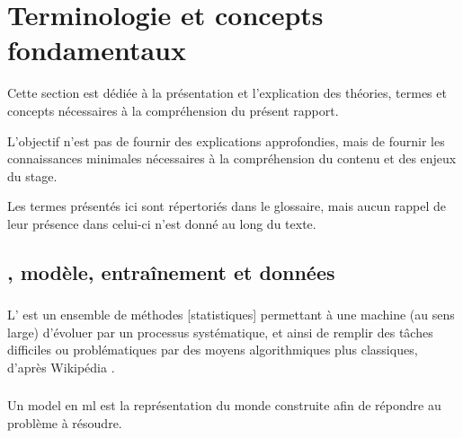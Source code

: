 \chapter{Terminologie et concepts fondamentaux}
Cette section est dédiée à la présentation et l'explication des théories, termes et concepts nécessaires à la compréhension du présent rapport.

L'objectif n'est pas de fournir des explications approfondies, mais de fournir les connaissances minimales nécessaires à la compréhension du contenu et des enjeux du stage.

Les termes présentés ici sont répertoriés dans le glossaire, mais aucun rappel de leur présence dans celui-ci n'est donné au long du texte.

\section{, modèle, entraînement et données}

\subsection{}
\label{subsec:ml} \label{def:ml}
L' est un ensemble de \og méthodes [statistiques] permettant à une machine (au sens large) d'évoluer par un processus systématique, et ainsi de remplir des tâches difficiles ou problématiques par des moyens algorithmiques plus classiques\fg{}, d'après Wikipédia \autocite{wiki_ml}.

\subsection{} \label{def:model}
Un \gls{model} en \gls{ml} est la représentation du monde construite afin de répondre au problème à résoudre.

